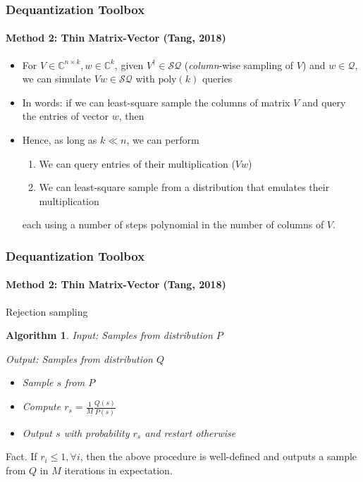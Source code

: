 \documentclass{beamer}
\newcommand\0{\mathbf{0}}
\newcommand\CC{\mathbb{C}}
\newcommand\<{\langle}
\renewcommand\>{\rangle}
\newtheorem{algorithm}{Algorithm}[theorem]
\begin{document}
\begin{frame}
\frametitle{Dequantization Toolbox}
\framesubtitle{Method 2: Thin Matrix-Vector (Tang, 2018)}
\begin{itemize}
	\item For $V \in \CC^{n\times k}, w \in \CC^k$, given $V^\dagger \in \mathcal{SQ}$ (\textit{column}-wise sampling of $V$) and $w \in \mathcal{Q}$, we can simulate $Vw \in \mathcal{SQ}$ with $\text{poly}(k)$ queries
	\item In words: if we can least-square sample the columns of matrix $V$ and query the entries of vector $w$, then
	\item Hence, as long as $k \ll n$, we can perform 

\begin{enumerate}
\item  We can query entries of their multiplication ($Vw$) 
\item We can least-square sample from a distribution that emulates their multiplication	
\end{enumerate}

each using a number of steps polynomial in the number of columns of $V$. 

\end{itemize}
\end{frame}

\begin{frame}
\frametitle{Dequantization Toolbox}
\framesubtitle{Method 2: Thin Matrix-Vector (Tang, 2018)}
\begin{definition}
Rejection sampling
\end{definition}
\begin{algorithm}
Input: Samples from distribution $P$

Output: Samples from distribution $Q$
\begin{itemize}
\item Sample $s$ from $P$
\item Compute $r_s = \frac{1}{M}\frac{Q(s)}{P(s)}$ 
\item Output $s$ with probability $r_s$ and restart otherwise
\end{itemize}
\end{algorithm}

\begin{fact}
Fact. If $r_i \leq 1, \forall i$, then the above procedure is well-defined and outputs a sample from $Q$ in $M$ iterations in expectation.	
\end{fact}


\end{frame}
\end{document}
